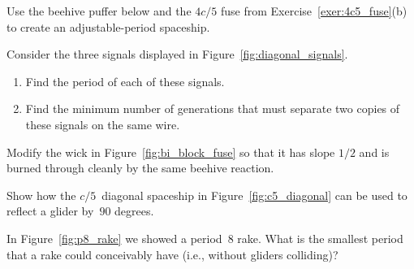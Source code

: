 \begin{multicols}{2}
	
	\mfilbreak
	
	
	\begin{problem}\label{exer:beehive_puffer} 
		Use the beehive puffer below and the $4c/5$ fuse from Exercise~\ref{exer:4c5_fuse}(b) to create an adjustable-period spaceship.
		
		\begin{center}
		\end{center}
		
	\end{problem}
	
	
	\mfilbreak
	
	
	\begin{problemstar}\label{exer:diagonal_signal} 
		Consider the three signals displayed in Figure~\ref{fig:diagonal_signals}.\smallskip
		
		\begin{enumerate}[label=\bf\color{ocre}(\alph*)]
			\item Find the period of each of these signals.
			
			\item Find the minimum number of generations that must separate two copies of these signals on the same wire.
		\end{enumerate}
	\end{problemstar}
	
	
	\mfilbreak
	
	
	\begin{problem}\label{exer:slanted_wick} 
		Modify the wick in Figure~\ref{fig:bi_block_fuse} so that it has slope $1/2$ and is burned through cleanly by the same beehive reaction.
	\end{problem}
	
	
	\mfilbreak
	
	
	\begin{problemstar}\label{exer:c5_diagonal_reflect} 
		Show how the $c/5$~diagonal spaceship in Figure~\ref{fig:c5_diagonal} can be used to reflect a glider by~$90$ degrees.
	\end{problemstar}
	
	
	\mfilbreak
	
	
	\begin{problem}\label{exer:low_period_rake} 
		In Figure~\ref{fig:p8_rake} we showed a period~$8$ rake. What is the smallest period that a rake could conceivably have (i.e., without gliders colliding)?
	\end{problem}
	

\end{multicols}
